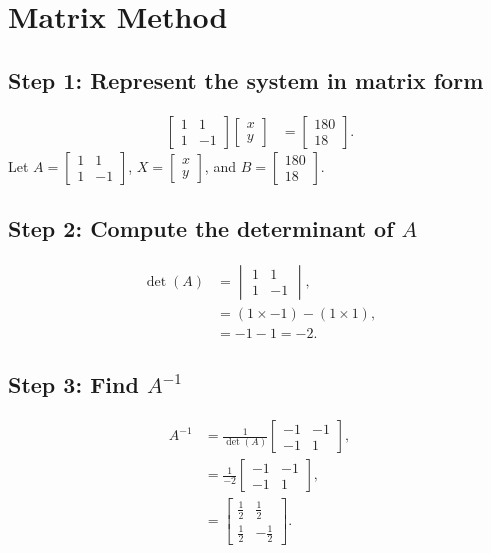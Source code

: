 \documentclass[journal]{IEEEtran}
\begin{document}
\section{Matrix Method}
\subsection*{Step 1: Represent the system in matrix form}
\begin{align}
    \begin{bmatrix} 1 & 1 \\ 1 & -1 \end{bmatrix}
    \begin{bmatrix} x \\ y \end{bmatrix} &=
    \begin{bmatrix} 180 \\ 18 \end{bmatrix}.
\end{align}
Let \(A = \begin{bmatrix} 1 & 1 \\ 1 & -1 \end{bmatrix}\), \(X = \begin{bmatrix} x \\ y \end{bmatrix}\), and \(B = \begin{bmatrix} 180 \\ 18 \end{bmatrix}\).

\subsection*{Step 2: Compute the determinant of \(A\)}
\begin{align}
    \det(A) &= \begin{vmatrix} 1 & 1 \\ 1 & -1 \end{vmatrix}, \\
    &= (1 \times -1) - (1 \times 1), \\
    &= -1 - 1 = -2.
\end{align}

\subsection*{Step 3: Find \(A^{-1}\)}
\begin{align}
    A^{-1} &= \frac{1}{\det(A)} \begin{bmatrix} -1 & -1 \\ -1 & 1 \end{bmatrix}, \\
    &= \frac{1}{-2} \begin{bmatrix} -1 & -1 \\ -1 & 1 \end{bmatrix}, \\
    &= \begin{bmatrix} \frac{1}{2} & \frac{1}{2} \\
    \frac{1}{2} & -\frac{1}{2} \end{bmatrix}.
\end{align}
\end{document}
